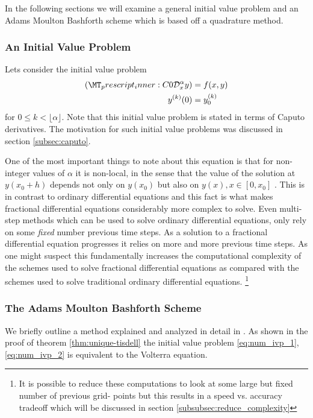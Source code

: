 In the following sections we will examine a general initial value problem and an Adams Moulton Bashforth scheme which is based off a quadrature method. \cite{Diethelm2011}

\subsubsection{An Initial Value Problem}
Lets consider the initial value problem
\begin{align}
    \label{eq:num_ivp_1}
    \capder{0}{x}{\alpha}{y} &= f(x,y) \\
    \label{eq:num_ivp_2}
    y^{(k)}(0) &= y_{0}^{(k)} 
\end{align}
for $ 0 \leq k < \lfloor \alpha \rfloor $. Note that this initial value problem is stated in terms of Caputo derivatives. The motivation for such initial value problems was discussed in section \ref{subsec:caputo}.

One of the most important things to note about this equation is that for non-integer values of $ \alpha $ it is non-local, in the sense that the value of the solution at $ y(x_0+h) $ depends not only on $ y(x_0) $ but also on $ y(x), x \in [0, x_0] $ \cite{Diethelm2010}. This is in contrast to ordinary differential equations and this fact is what makes fractional differential equations considerably more complex to solve. Even multi-step methods which can be used to solve ordinary differential equations, only rely on some \emph{fixed} number previous time steps. As a solution to a fractional differential equation progresses it relies on more and more previous time steps. As one might suspect this fundamentally increases the computational complexity of the schemes used to solve fractional differential equations as compared with the schemes used to solve traditional ordinary differential equations. \footnote{It is possible to reduce these computations to look at some large but fixed number of previous grid-
points 
but this results in a speed vs. accuracy tradeoff which will be discussed in section \ref{subsubsec:reduce_complexity}}

\subsubsection{The Adams Moulton Bashforth Scheme}
\label{sec:amb_desc}
We briefly outline a method explained and analyzed in detail in \cite{Diethelm2004}. As shown in the proof of theorem \ref{thm:unique-tisdell} the initial value problem \eqref{eq:num_ivp_1}, \eqref{eq:num_ivp_2} is equivalent to the Volterra equation.

